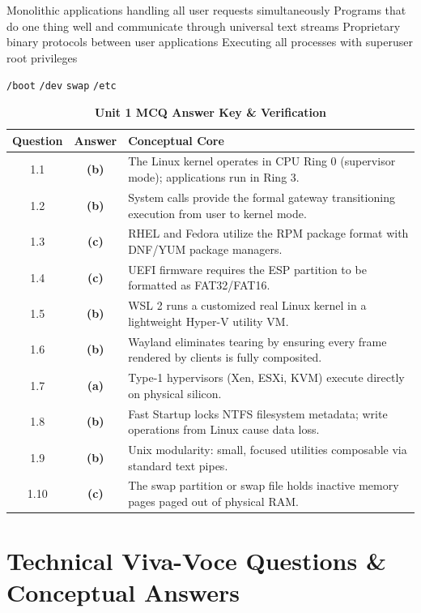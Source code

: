 {Monolithic applications handling all user requests simultaneously}
{Programs that do one thing well and communicate through universal text streams}
{Proprietary binary protocols between user applications}
{Executing all processes with superuser root privileges}

{\texttt{/boot}}
{\texttt{/dev}}
{\texttt{swap}}
{\texttt{/etc}}

\begin{table}[htbp]
\centering
\caption{\textbf{Unit 1 MCQ Answer Key \& Verification}}
\begin{tabularx}{0.85\linewidth}{c c X}
\toprule
\textbf{Question} & \textbf{Answer} & \textbf{Conceptual Core} \\
\midrule
1.1 & \textbf{(b)} & The Linux kernel operates in CPU Ring 0 (supervisor mode); applications run in Ring 3. \\
1.2 & \textbf{(b)} & System calls provide the formal gateway transitioning execution from user to kernel mode. \\
1.3 & \textbf{(c)} & RHEL and Fedora utilize the RPM package format with DNF/YUM package managers. \\
1.4 & \textbf{(c)} & UEFI firmware requires the ESP partition to be formatted as FAT32/FAT16. \\
1.5 & \textbf{(b)} & WSL 2 runs a customized real Linux kernel in a lightweight Hyper-V utility VM. \\
1.6 & \textbf{(b)} & Wayland eliminates tearing by ensuring every frame rendered by clients is fully composited. \\
1.7 & \textbf{(a)} & Type-1 hypervisors (Xen, ESXi, KVM) execute directly on physical silicon. \\
1.8 & \textbf{(b)} & Fast Startup locks NTFS filesystem metadata; write operations from Linux cause data loss. \\
1.9 & \textbf{(b)} & Unix modularity: small, focused utilities composable via standard text pipes. \\
1.10 & \textbf{(c)} & The swap partition or swap file holds inactive memory pages paged out of physical RAM. \\
\bottomrule
\end{tabularx}
\end{table}

\section{Technical Viva-Voce Questions \& Conceptual Answers}

